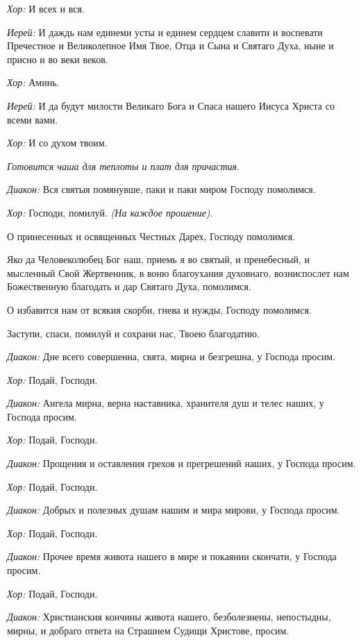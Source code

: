 \begin{mymulticols}
 {\itshape Хор:} И всех и вся.

 {\itshape Иерей:} И даждь нам единеми усты и единем сердцем славити и воспевати Пречестное и Великолепное Имя Твое, Отца и Сына и Святаго Духа, ныне и присно и во веки веков. 

{\itshape Хор:} Аминь.
  
   {\itshape Иерей:} И да будут милости Великаго Бога и Спаса нашего Иисуса Христа со всеми вами.
  
  {\itshape Хор:} И со духом твоим.
  
  {\itshape Готовится чаша для теплоты и плат для причастия}. 




 {\itshape Диакон:} Вся святыя помянувше, паки и паки миром Господу помолимся. 


{\itshape Хор:} Господи, помилуй. {\itshape (На каждое прошение)}. 


  О принесенных и освященных Честных Дарех, Господу помолимся. 


  Яко да Человеколюбец Бог наш, приемь я во святый, и пренебесный, и мысленный Свой Жертвенник, в воню благоухания духовнаго, возниспослет нам Божественную благодать и дар Святаго Духа, помолимся. 


  О избавится нам от всякия скорби, гнева и нужды, Господу помолимся. 


  Заступи, спаси, помилуй и сохрани нас, Твоею благодатию. 


{\itshape Диакон:} Дне всего совершенна, свята, мирна и безгрешна, у Господа просим. 

{\itshape Хор:} Подай, Господи.

{\itshape Диакон:} Ангела мирна, верна наставника, хранителя душ и телес наших, у Господа просим. 

{\itshape Хор:} Подай, Господи.

{\itshape Диакон:} Прощения и оставления грехов и прегрешений наших, у Господа просим. 

{\itshape Хор:} Подай, Господи.

{\itshape Диакон:} Добрых и полезных душам нашим и мира мирови, у Господа просим. 

{\itshape Хор:} Подай, Господи.

{\itshape Диакон:} Прочее время живота нашего в мире и покаянии скончати, у Господа просим. 

{\itshape Хор:} Подай, Господи.

{\itshape Диакон:} Христианския кончины живота нашего, безболезнены, непостыдны, мирны, и добраго ответа на Страшнем Судищи Христове, просим. 


\end{mymulticols}

